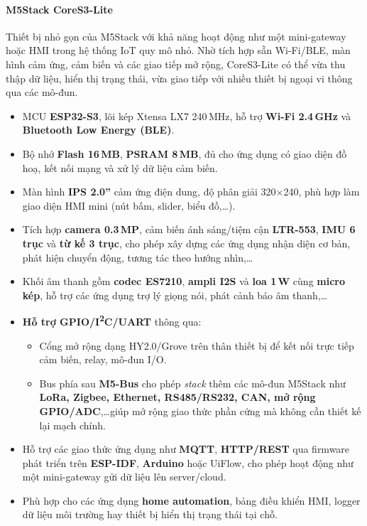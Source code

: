                 \paragraph*{M5Stack CoreS3-Lite}
                    Thiết bị nhỏ gọn của M5Stack với khả năng hoạt động như một mini-gateway hoặc HMI trong hệ thống IoT quy mô nhỏ. Nhờ tích hợp sẵn Wi-Fi/BLE, màn hình cảm ứng, cảm biến và các giao tiếp mở rộng, CoreS3-Lite có thể vừa thu thập dữ liệu, hiển thị trạng thái, vừa giao tiếp với nhiều thiết bị ngoại vi thông qua các mô-đun.
                    \begin{itemize}
                        \item MCU \textbf{ESP32-S3}, lõi kép Xtensa LX7 240\,MHz, hỗ trợ \textbf{Wi-Fi 2.4\,GHz} và \textbf{Bluetooth Low Energy (BLE)}.
                        \item Bộ nhớ \textbf{Flash 16\,MB}, \textbf{PSRAM 8\,MB}, đủ cho ứng dụng có giao diện đồ hoạ, kết nối mạng và xử lý dữ liệu cảm biến.
                        \item Màn hình \textbf{IPS 2.0''} cảm ứng điện dung, độ phân giải 320$\times$240, phù hợp làm giao diện HMI mini (nút bấm, slider, biểu đồ,\dots).
                        \item Tích hợp \textbf{camera 0.3\,MP}, cảm biến ánh sáng/tiệm cận \textbf{LTR-553}, \textbf{IMU 6 trục} và \textbf{từ kế 3 trục}, cho phép xây dựng các ứng dụng nhận diện cơ bản, phát hiện chuyển động, tương tác theo hướng nhìn,\dots
                        \item Khối âm thanh gồm \textbf{codec ES7210}, \textbf{ampli I2S} và \textbf{loa 1\,W} cùng \textbf{micro kép}, hỗ trợ các ứng dụng trợ lý giọng nói, phát cảnh báo âm thanh,\dots
                        \item \textbf{Hỗ trợ GPIO/I\textsuperscript{2}C/UART} thông qua:
                        \begin{itemize}
                            \item Cổng mở rộng dạng HY2.0/Grove trên thân thiết bị để kết nối trực tiếp cảm biến, relay, mô-đun I/O.
                            \item Bus phía sau \textbf{M5-Bus} cho phép \emph{stack} thêm các mô-đun M5Stack như \textbf{LoRa, Zigbee, Ethernet, RS485/RS232, CAN, mở rộng GPIO/ADC},\dots giúp mở rộng giao thức phần cứng mà không cần thiết kế lại mạch chính.
                        \end{itemize}
                        \item Hỗ trợ các giao thức ứng dụng như \textbf{MQTT}, \textbf{HTTP/REST} qua firmware phát triển trên \textbf{ESP-IDF}, \textbf{Arduino} hoặc UiFlow, cho phép hoạt động như một mini-gateway gửi dữ liệu lên server/cloud.
                        \item Phù hợp cho các ứng dụng \textbf{home automation}, bảng điều khiển HMI, logger dữ liệu môi trường hay thiết bị hiển thị trạng thái tại chỗ.
                    \end{itemize}

